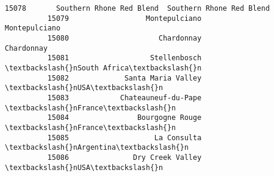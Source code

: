 \documentclass[11pt]{article}
\begin{document}
\begin{Verbatim}[commandchars=\\\{\}]
          15078       Southern Rhone Red Blend  Southern Rhone Red Blend   
          15079                  Montepulciano             Montepulciano   
          15080                     Chardonnay                Chardonnay   
          15081                   Stellenbosch          \textbackslash{}nSouth Africa\textbackslash{}n   
          15082             Santa Maria Valley                   \textbackslash{}nUSA\textbackslash{}n   
          15083            Chateauneuf-du-Pape                \textbackslash{}nFrance\textbackslash{}n   
          15084                Bourgogne Rouge                \textbackslash{}nFrance\textbackslash{}n   
          15085                    La Consulta             \textbackslash{}nArgentina\textbackslash{}n   
          15086               Dry Creek Valley                   \textbackslash{}nUSA\textbackslash{}n   
          

\end{Verbatim}
\end{document}
